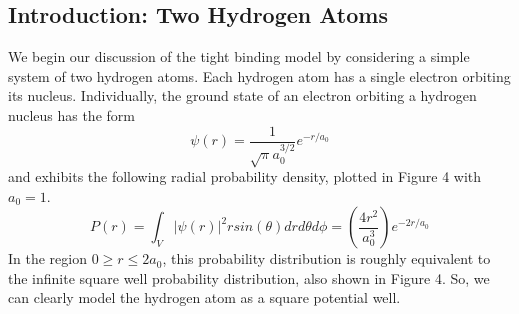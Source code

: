 \documentclass{article}
\begin{document}
\subsection{Introduction: Two Hydrogen Atoms}
We begin our discussion of the tight binding model by considering a simple system of two hydrogen atoms. Each hydrogen atom has a single electron orbiting its nucleus. Individually,
the ground state of an electron orbiting a hydrogen nucleus has the form
$$ \psi(r) = \frac{1}{\sqrt{\pi}a_{0}^{3/2}}e^{-r/a_{0}}$$
and exhibits the following radial probability density, plotted in Figure 4 with $a_{0} = 1$.
$$ P(r) = \int_{V} \left | \psi(r)\right |^{2} rsin(\theta)drd\theta d\phi= \left ( \frac{4r^{2}}{a_{0}^3}\right )e^{-2r/a_{0}}$$
In the region $0 \geq r \leq 2a_{0}$, this probability distribution is roughly equivalent to the infinite square well probability distribution, also shown in Figure 4. So, we can
clearly model the hydrogen atom as a square potential well.
\end{document}
